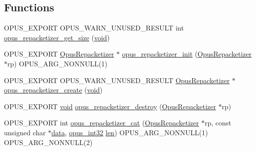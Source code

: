 \subsection*{Functions}
\begin{DoxyCompactItemize}
\item 
O\+P\+U\+S\+\_\+\+E\+X\+P\+O\+RT O\+P\+U\+S\+\_\+\+W\+A\+R\+N\+\_\+\+U\+N\+U\+S\+E\+D\+\_\+\+R\+E\+S\+U\+LT int \mbox{\hyperlink{group__opus__repacketizer_ga833b745bf92317e9ac26797a56eba6fd}{opus\+\_\+repacketizer\+\_\+get\+\_\+size}} (\mbox{\hyperlink{_s_d_l__opengles2__gl2ext_8h_ae5d8fa23ad07c48bb609509eae494c95}{void}})
\item 
O\+P\+U\+S\+\_\+\+E\+X\+P\+O\+RT \mbox{\hyperlink{group__opus__repacketizer_ga1f85070a64bcbf5bf24f5ccb80323e7b}{Opus\+Repacketizer}} $\ast$ \mbox{\hyperlink{group__opus__repacketizer_gadef533688e80dcc96a32b955657aaf28}{opus\+\_\+repacketizer\+\_\+init}} (\mbox{\hyperlink{group__opus__repacketizer_ga1f85070a64bcbf5bf24f5ccb80323e7b}{Opus\+Repacketizer}} $\ast$rp) O\+P\+U\+S\+\_\+\+A\+R\+G\+\_\+\+N\+O\+N\+N\+U\+LL(1)
\item 
O\+P\+U\+S\+\_\+\+E\+X\+P\+O\+RT O\+P\+U\+S\+\_\+\+W\+A\+R\+N\+\_\+\+U\+N\+U\+S\+E\+D\+\_\+\+R\+E\+S\+U\+LT \mbox{\hyperlink{group__opus__repacketizer_ga1f85070a64bcbf5bf24f5ccb80323e7b}{Opus\+Repacketizer}} $\ast$ \mbox{\hyperlink{group__opus__repacketizer_gaa70e9708619188f673b5dc3f494c46ea}{opus\+\_\+repacketizer\+\_\+create}} (\mbox{\hyperlink{_s_d_l__opengles2__gl2ext_8h_ae5d8fa23ad07c48bb609509eae494c95}{void}})
\item 
O\+P\+U\+S\+\_\+\+E\+X\+P\+O\+RT \mbox{\hyperlink{_s_d_l__opengles2__gl2ext_8h_ae5d8fa23ad07c48bb609509eae494c95}{void}} \mbox{\hyperlink{group__opus__repacketizer_gab03f22d1139a42e450761ad99ca3d882}{opus\+\_\+repacketizer\+\_\+destroy}} (\mbox{\hyperlink{group__opus__repacketizer_ga1f85070a64bcbf5bf24f5ccb80323e7b}{Opus\+Repacketizer}} $\ast$rp)
\item 
O\+P\+U\+S\+\_\+\+E\+X\+P\+O\+RT int \mbox{\hyperlink{group__opus__repacketizer_gaa739f0bbc0ad09ad159ffb6455a6bb55}{opus\+\_\+repacketizer\+\_\+cat}} (\mbox{\hyperlink{group__opus__repacketizer_ga1f85070a64bcbf5bf24f5ccb80323e7b}{Opus\+Repacketizer}} $\ast$rp, const unsigned char $\ast$\mbox{\hyperlink{_s_d_l__opengl_8h_a2e335d56e2846b0fea47eed068b2d34a}{data}}, \mbox{\hyperlink{opus__types_8h_aa4d309d6f80b99dbabebc8f98879ab9a}{opus\+\_\+int32}} \mbox{\hyperlink{_s_d_l__opengl__glext_8h_a652168017ea9a8bbcead03d5c16269fb}{len}}) O\+P\+U\+S\+\_\+\+A\+R\+G\+\_\+\+N\+O\+N\+N\+U\+LL(1) O\+P\+U\+S\+\_\+\+A\+R\+G\+\_\+\+N\+O\+N\+N\+U\+LL(2)

\end{DoxyCompactItemize}
